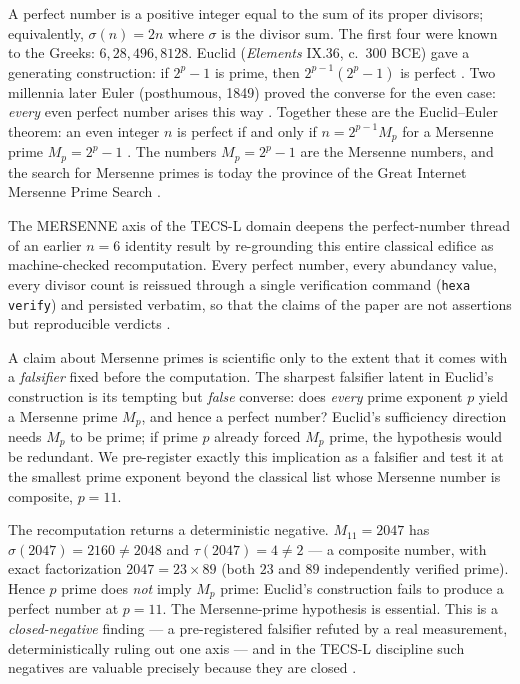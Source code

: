 \documentclass[11pt,a4paper]{article}
\newcommand{\sig}{\sigma}
\newcommand{\Mp}{M_p}
\theoremstyle{definition}
\begin{document}
A perfect number is a positive integer equal to the sum of its proper divisors;
equivalently, $\sig(n)=2n$ where $\sig$ is the divisor sum. The first four were
known to the Greeks: $6, 28, 496, 8128$. Euclid (\emph{Elements} IX.36, c.\ 300
BCE) gave a generating construction: if $2^p-1$ is prime, then
$2^{p-1}(2^p-1)$ is perfect \citep{euclid}. Two millennia later Euler
(posthumous, 1849) proved the converse for the even case: \emph{every} even
perfect number arises this way \citep{euler1849}. Together these are the
Euclid--Euler theorem: an even integer $n$ is perfect if and only if
$n = 2^{p-1}\Mp$ for a Mersenne prime $\Mp = 2^p-1$ \citep{hardy-wright}. The
numbers $\Mp = 2^p-1$ are the Mersenne numbers, and the search for Mersenne
primes is today the province of the Great Internet Mersenne Prime Search
\citep{gimps}.

The MERSENNE axis of the TECS-L domain deepens the perfect-number thread of an
earlier $n=6$ identity result \citep{tecs-l-locus} by re-grounding this entire
classical edifice as machine-checked recomputation. Every perfect number, every
abundancy value, every divisor count is reissued through a single verification
command (\texttt{hexa verify}) and persisted verbatim, so that the claims of the
paper are not assertions but reproducible verdicts \citep{tecs-l-claims}.

A claim about Mersenne primes is scientific only to the extent that it comes with
a \emph{falsifier} fixed before the computation. The sharpest falsifier latent in
Euclid's construction is its tempting but \emph{false} converse: does
\emph{every} prime exponent $p$ yield a Mersenne prime $\Mp$, and hence a perfect
number? Euclid's sufficiency direction needs $\Mp$ to be prime; if prime $p$
already forced $\Mp$ prime, the hypothesis would be redundant. We pre-register
exactly this implication as a falsifier and test it at the smallest prime
exponent beyond the classical list whose Mersenne number is composite, $p=11$.

The recomputation returns a deterministic negative. $M_{11}=2047$ has
$\sig(2047)=2160\neq 2048$ and $\tau(2047)=4\neq 2$ --- a composite number, with
exact factorization $2047 = 23\times 89$ (both $23$ and $89$ independently
verified prime). Hence $p$ prime does \emph{not} imply $\Mp$ prime: Euclid's
construction fails to produce a perfect number at $p=11$. The Mersenne-prime
hypothesis is essential. This is a \emph{closed-negative} finding --- a
pre-registered falsifier refuted by a real measurement, deterministically ruling
out one axis --- and in the TECS-L discipline such negatives are valuable
precisely because they are closed \citep{tecs-l-negative-ok}.
\end{document}
